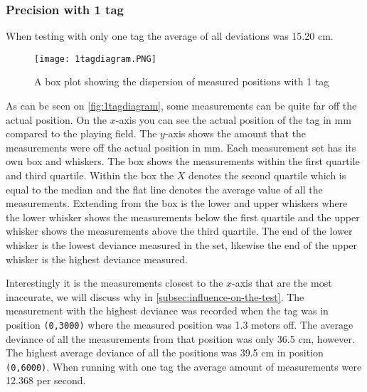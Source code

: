 \subsubsection{Precision with 1 tag}
When testing with only one tag the average of all deviations was 15.20 cm.
\begin{figure}[H]
    \centering
    \texttt{[image: 1tagdiagram.PNG]}
    \caption{A box plot showing the dispersion of measured positions with 1 tag}
    \label{fig:1tagdiagram}
\end{figure}
\noindent
As can be seen on \autoref{fig:1tagdiagram}, some measurements can be quite far off the actual position.
On the $x$-axis you can see the actual position of the tag in mm compared to the playing field.
The $y$-axis shows the amount that the measurements were off the actual position in mm.
Each measurement set has its own box and whiskers.
The box shows the measurements within the first quartile and third quartile.
Within the box the $X$ denotes the second quartile which is equal to the median and the flat line denotes the average value of all the measurements.
Extending from the box is the lower and upper whiskers where the lower whisker shows the measurements below the first quartile and the upper whisker shows the measurements above the third quartile.
The end of the lower whisker is the lowest deviance measured in the set, likewise the end of the upper whisker is the highest deviance measured.

Interestingly it is the measurements closest to the $x$-axis that are the most inaccurate, we will discuss why in \autoref{subsec:influence-on-the-test}.
The measurement with the highest deviance was recorded when the tag was in position \texttt{(0,3000)} where the measured position was 1.3 meters off.
The average deviance of all the measurements from that position was only 36.5 cm, however.
The highest average deviance of all the positions was 39.5 cm in position \texttt{(0,6000)}.
When running with one tag the average amount of measurements were 12.368 per second.


